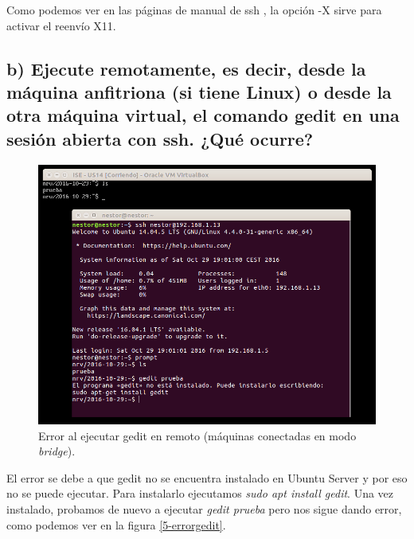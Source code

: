 \documentclass[a4paper,titlepage,12pt]{scrartcl}	%
\numberwithin{figure}{section} %
\numberwithin{table}{section} %
\begin{document}
	Como podemos ver en las páginas de manual de ssh \cite{opensshman}, la opción -X sirve para activar el reenvío X11.
	
	\subsection[b) Ejecute remotamente, es decir, desde la máquina anfitriona (si tiene Linux) o desde la otra máquina virtual, el comando gedit en una sesión abierta con ssh. ¿Qué ocurre?]{b) Ejecute remotamente, es decir, desde la máquina anfitriona (si tiene Linux) o desde la otra máquina virtual, el comando gedit en una sesión abierta con ssh. ¿Qué ocurre?}
	
	\begin{figure}[H]
		\centering
		\includegraphics[scale=0.43]{./Imagenes/5-gedit.png}
		\caption[Error al ejecutar gedit en remoto (máquinas conectadas en modo \textit{bridge}).]{Error al ejecutar gedit en remoto (máquinas conectadas en modo \textit{bridge}).}
	\end{figure}
	
	El error se debe a que gedit no se encuentra instalado en Ubuntu Server y por eso no se puede ejecutar. Para instalarlo ejecutamos \textit{sudo apt install gedit}. Una vez instalado, probamos de nuevo a ejecutar \textit{gedit prueba} pero nos sigue dando error, como podemos ver en la figura \ref{5-errorgedit}.
	
\end{document}
